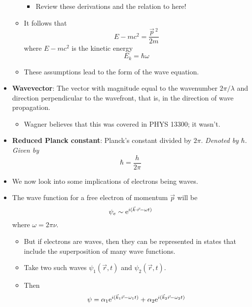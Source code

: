 \documentclass[../notes.tex]{subfiles}
\begin{document}
\begin{itemize}
\begin{itemize}
\begin{itemize}
            \item Review these derivations and the relation to here!
        \end{itemize}
        \item It follows that
        \begin{equation*}
            E-mc^2 = \frac{\vec{p}{\,}^2}{2m}
        \end{equation*}
        where $E-mc^2$ is the kinetic energy
        \begin{equation*}
            E_k = \hbar\omega
        \end{equation*}
        \item These assumptions lead to the form of the wave equation.
    \end{itemize}
    \item \textbf{Wavevector}: The vector with magnitude equal to the wavenumber $2\pi/\lambda$ and direction perpendicular to the wavefront, that is, in the direction of wave propagation.
    \begin{itemize}
        \item Wagner believes that this was covered in PHYS 13300; it wasn't.
    \end{itemize}
    \item \textbf{Reduced Planck constant}: Planck's constant divided by $2\pi$. \emph{Denoted by} $\bm{\hbar}$. \emph{Given by}
    \begin{equation*}
        \hbar = \frac{h}{2\pi}
    \end{equation*}
    \item We now look into some implications of electrons being waves.
    \item The wave function for a free electron of momentum $\vec{p}$ will be
    \begin{equation*}
        \psi_e \sim \e[i(\vec{k}\cdot\vec{r}-\omega t)]
    \end{equation*}
    where $\omega=2\pi\nu$.
    \begin{itemize}
        \item But if electrons are waves, then they can be represented in states that include the superposition of many wave functions.
        \item Take two such waves $\psi_1(\vec{r},t)$ and $\psi_2(\vec{r},t)$.
        \item Then
        \begin{equation*}
            \psi = \alpha_1\e[i(\vec{k}_1\vec{r}-\omega_1t)]+\alpha_2\e[i(\vec{k}_2\vec{r}-\omega_2t)]
        \end{equation*}

\end{itemize}
\end{itemize}
\end{document}
